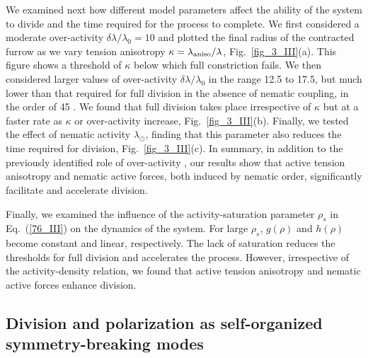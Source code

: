 {We examined next how different model parameters affect the ability of the system to divide and the time required for the process to complete. We first considered a moderate over-activity $\delta\lambda/\lambda_0 = 10$ and plotted the final radius of the contracted furrow as we vary tension anisotropy $\kappa = \lambda_{\rm aniso}/\lambda$, Fig.~\ref{fig_3_III}(a). This figure shows a threshold of $\kappa$ below which full constriction fails. We then considered larger values of over-activity  $\delta\lambda/\lambda_0$ in the range 12.5 to 17.5, but much lower than that required for full division in the absence of nematic coupling, in the order of 45 \cite{turlier2014}. We found   that full division takes place irrespective of $\kappa$ but at a faster rate as $\kappa$ or over-activity increase, Fig.~\ref{fig_3_III}(b).  Finally, we tested the effect of  nematic activity $\lambda_{\odot}$, finding that this parameter also reduces the time required for division, Fig.~\ref{fig_3_III}(c). In summary, in addition to the previously identified role of over-activity \cite{turlier2014}, our results show that active tension anisotropy and nematic active forces, both induced by nematic order, significantly facilitate and accelerate division.


Finally, we examined the influence of the activity-saturation parameter $\rho_s$ in Eq.~(\ref{76_III}) on the dynamics of the system. For large $\rho_s$, $g(\rho)$ and $h(\rho)$ become constant and linear, respectively. The lack of saturation reduces the thresholds for full division and accelerates the process. %
However, irrespective of the activity-density relation, we found that  active tension anisotropy and nematic active forces enhance division.


\subsection{Division and polarization as self-organized symmetry-breaking modes}


}
